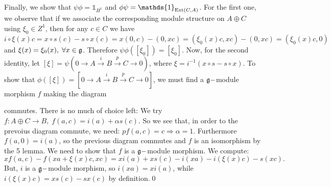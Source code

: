 Finally, we show that $\psi\phi=\mathds{1}_{H^1}$ and $\phi\psi=\mathds{1}_{\Ext(C,A)}$. For the first one, we observe that
if we associate the corresponding module structure on $A\oplus C$ 
using $\xi_0\in Z^1$, then for any $c\in C$ we have
\begin{equation}
    i\circ \xi(x)c=x\circ s(c)-s\circ x(c)=x(0,c)-(0,xc)=(\xi_0(x)c,xc)-(0,xc)=(\xi_0(x)c,0)
\end{equation}
and $\xi(x)=\xi_0(x),\;\forall x\in\mathfrak{g}$. Therefore $\psi\phi([\xi_0])=[\xi_0]$. Now, for the second identity, let 
$[\xi]=\psi(0\to A\overset{i}{\to} B\overset{p}{\to} C\to0)$, where $\xi=i^{-1}(x\circ s-s\circ x)$. To show that 
$\phi([\xi])=[0\to A\overset{i}{\to} B\overset{p}{\to} C\to0]$, we must find a $\mathfrak{g}-$module morphism $f$ making 
the diagram 
\begin{center}
\end{center}
commutes. There is no much of choice left: We try $f:A\oplus C\to B,\;f(a,c)=i(a)+\alpha s(c)$. So we see that, 
in order to the prevoius diagram commute, we need: $pf(a,c)=c\Rightarrow \alpha=1$. Furthermore $f(a,0)=i(a)$, so the previous 
diagram commutes and $f$ is an isomorphism by the 5 lemma. We need to show that $f$ is a $\mathfrak{g}-$module morphism. We 
compute:
\begin{equation}
        xf(a,c)-f(xa+\xi(x)c,xc) 
        =xi(a)+xs(c)-i(xa)-i(\xi(x)c)-s(xc).
\end{equation}
But, $i$ is a $\mathfrak{g}-$module morphism, so $i(xa)=xi(a)$, while $i(\xi(x)c)=xs(c)-sx(c)$ by definition.\qed

